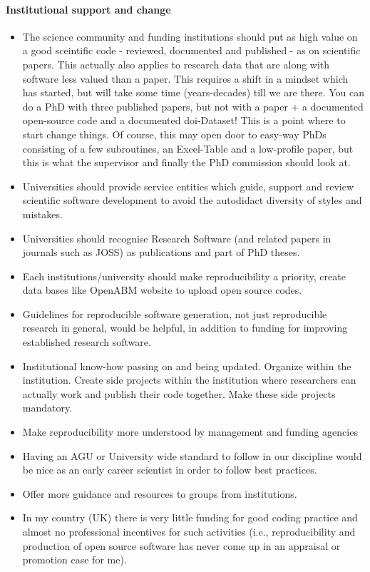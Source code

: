 \documentclass{article}
\begin{document}
\paragraph{Institutional support and change}
\begin{itemize}
	\item The science community and funding institutions should put as high value on a good sceintific code - reviewed, documented and published - as on scientific papers. This actually also applies to research data that are along with software less valued than a paper. This requires a shift in a mindset which has started, but will take some time (years-decades) till we are there. You can do a PhD with three published papers, but not with a paper + a documented open-source code and a documented doi-Dataset! This is a point where to start change things. Of course, this may open door to easy-way PhDs consisting of a few subroutines, an Excel-Table and a low-profile paper, but this is what the supervisor and finally the PhD commission should look at.
	\item Universities should provide service entities which guide, support and review scientific software development to avoid the autodidact diversity of styles and mistakes.
	\item Universities should recognise Research Software (and related papers in journals such as JOSS) as publications and part of PhD theses. 
	\item Each institutions/university should make reproducibility a priority, create data bases like OpenABM website to upload open source codes.
	\item Guidelines for reproducible software generation, not just reproducible research in general, would be helpful, in addition to funding for improving established research software.
	\item Institutional know-how passing on and being updated. Organize within the institution. Create side projects within the institution where researchers can actually work and publish their code together. Make these side projects mandatory.
	\item Make reproducibility more understood by management and funding agencies
	\item Having an AGU or University wide standard to follow in our discipline would be nice as an early career scientist in order to follow best practices. 
	\item Offer more guidance and resources to groups from institutions.
	\item In my country (UK) there is very little funding for good coding practice and almost no professional incentives for such activities (i.e., reproducibility and production of open source software has never come up in an appraisal or promotion case for me). 

\end{itemize}
\end{document}
